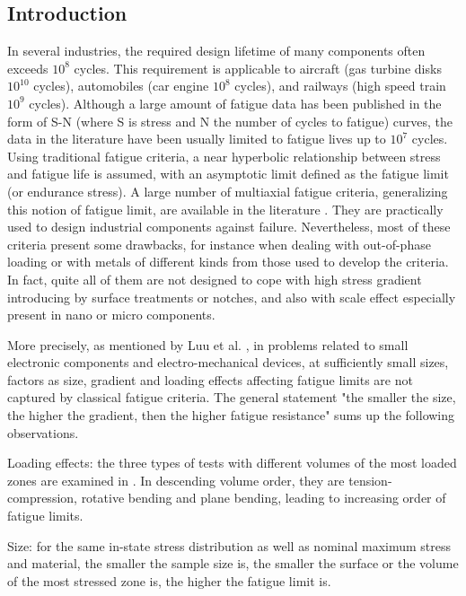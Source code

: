 \documentclass[3p,times,procedia,number]{elsarticle}
\begin{document}
\subsection{Introduction}

In several industries, the required design lifetime of many components often exceeds $ 10^8 $ cycles. This requirement is applicable to aircraft (gas turbine disks $ 10^{10} $ cycles), automobiles (car engine $ 10^8 $ cycles), and railways (high speed train $ 10^9 $ cycles). Although a large amount of fatigue data has been published in the form of S-N (where S is stress and N  the number of cycles to fatigue) curves, the data in the literature have been usually limited to fatigue lives up to $ 10^7 $ cycles. Using traditional fatigue criteria, a near hyperbolic relationship between stress and fatigue life is assumed, with an asymptotic limit defined as the fatigue limit (or endurance stress). 
A large number of multiaxial fatigue criteria, generalizing this notion of fatigue limit, are available in the literature \cite{Papadopoulos1997219}\cite{ballard1995high}\cite{suresh1998fatigue}. They are practically used to design industrial components against failure. Nevertheless, most of these criteria present some drawbacks,  for instance when dealing with out-of-phase loading or with metals of different kinds from those used to develop the criteria. In fact, quite all of them are not designed to cope with high stress gradient introducing by surface treatments or notches, and also with scale effect especially present in nano or micro components. 

More precisely, as mentioned by Luu et al. \cite{luu2013formulation}, in problems related to small electronic components and electro-mechanical devices, at sufficiently small sizes, factors as size, gradient and loading effects affecting fatigue limits are not captured by classical fatigue criteria. The general statement "the smaller the size, the higher the gradient, then the higher fatigue resistance" sums up the following observations. 

Loading effects: the three types of tests with different volumes of the most loaded zones are examined in \cite{luu2013formulation}. In descending volume order, they are tension-compression, rotative bending and plane bending, leading to increasing order of fatigue limits.

Size: for the same in-state stress distribution as well as nominal maximum stress and material, the smaller the sample size is, the smaller the surface or the volume of the most stressed zone is, the higher the fatigue limit is. 
\end{document}
